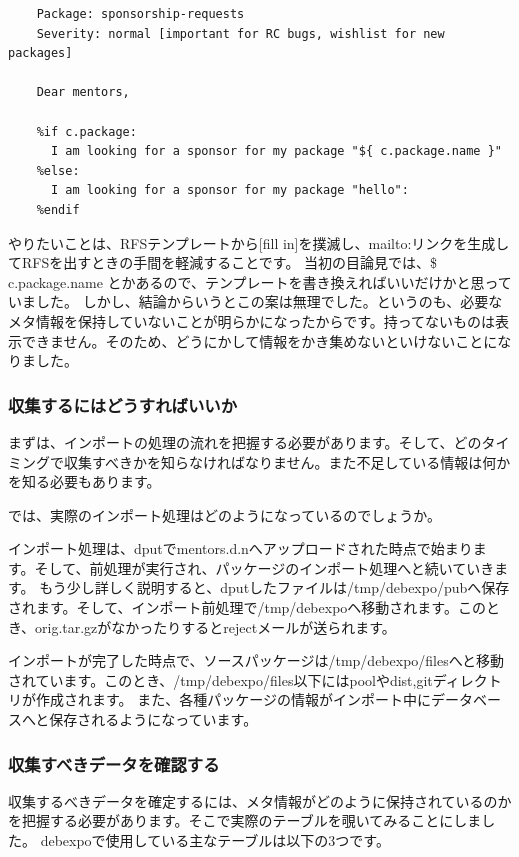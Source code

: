 \documentclass[mingoth,a4paper]{jsarticle}
\begin{document}
\begin{screen}
\begin{verbatim}
    Package: sponsorship-requests
    Severity: normal [important for RC bugs, wishlist for new packages]

    Dear mentors,

    %if c.package:
      I am looking for a sponsor for my package "${ c.package.name }"
    %else:
      I am looking for a sponsor for my package "hello":
    %endif
\end{verbatim}
\end{screen}


やりたいことは、RFSテンプレートから[fill in]を撲滅し、mailto:リンクを生成してRFSを出すときの手間を軽減することです。
当初の目論見では、\${ c.package.name }とかあるので、テンプレートを書き換えればいいだけかと思っていました。
しかし、結論からいうとこの案は無理でした。というのも、必要なメタ情報を保持していないことが明らかになったからです。持ってないものは表示できません。そのため、どうにかして情報をかき集めないといけないことになりました。

\subsubsection{収集するにはどうすればいいか}

まずは、インポートの処理の流れを把握する必要があります。そして、どのタイミングで収集すべきかを知らなければなりません。また不足している情報は何かを知る必要もあります。

では、実際のインポート処理はどのようになっているのでしょうか。

インポート処理は、dputでmentors.d.nへアップロードされた時点で始まります。そして、前処理が実行され、パッケージのインポート処理へと続いていきます。
もう少し詳しく説明すると、dputしたファイルは/tmp/debexpo/pubへ保存されます。そして、インポート前処理で/tmp/debexpoヘ移動されます。このとき、orig.tar.gzがなかったりするとrejectメールが送られます。

インポートが完了した時点で、ソースパッケージは/tmp/debexpo/filesへと移動されています。このとき、/tmp/debexpo/files以下にはpoolやdist,gitディレクトリが作成されます。
また、各種パッケージの情報がインポート中にデータベースへと保存されるようになっています。

\subsubsection{収集すべきデータを確認する}

収集するべきデータを確定するには、メタ情報がどのように保持されているのかを把握する必要があります。そこで実際のテーブルを覗いてみることにしました。
debexpoで使用している主なテーブルは以下の3つです。
\end{document}

